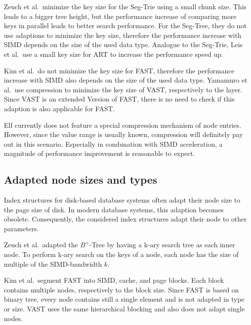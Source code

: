 \documentclass[runningheads,a4paper]{llncs}
\begin{document}
Zeuch et al.\ minimize the key size for the Seg-Trie using a small chunk size. This leads to a bigger tree height, but the performance increase of comparing more keys in parallel leads to better search performance. For the Seg-Tree, they do not use adaptions to minimize the key size, therefore the performance increase with SIMD depends on the size of the used data type. Analogue to the Seg-Trie, Leis et al.\ use a small key size for ART to increase the performance speed up.

Kim et al.\ do not minimize the key size for FAST, therefore the performance increase with SIMD also depends on the size of the used data type. Yamamuro et al.\ use compression to minimize the key size of VAST, respectively to the layer. Since VAST is an extended Version of FAST, there is no need to check if this adaption is also applicable for FAST. 

Elf currently does not feature a special compression mechanism of node entries. However, since the value range is usually known, compression will definitely pay out in this scenario. Especially in combination with SIMD acceleration, a magnitude of performance improvement is reasonable to expect.

\subsection{Adapted node sizes and types}
Index structures for disk-based database systems often adapt their node size to the page size of disk. In modern database systems, this adaption becomes obsolete. Consequently, the considered index structures adapt their node to other parameters. 

Zeuch et al.\ adapted the $B^+$-Tree by having a k-ary search tree as each inner node. To perform k-ary search on the keys of a node, each node has the size of multiple of the SIMD-bandwidth $k$.

Kim et al.\ segment FAST into SIMD, cache, and page blocks. Each block contains multiple nodes, respectively to the block size. Since FAST is based on binary tree, every node contains still a single element and is not adapted in type or size. VAST uses the same hierarchical blocking and also does not adapt single nodes.
\end{document}
